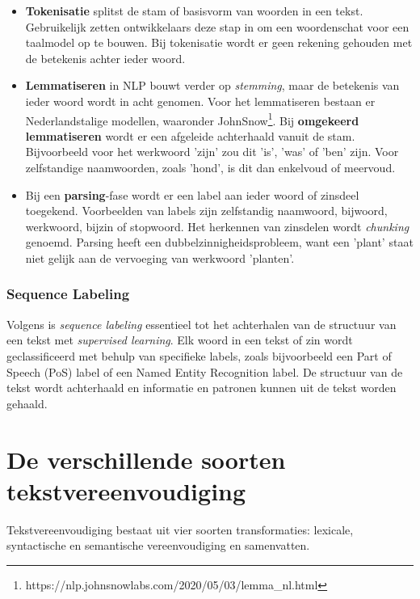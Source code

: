 \begin{itemize}
	\item \textbf{Tokenisatie} splitst de stam of basisvorm van woorden in een tekst. Gebruikelijk zetten ontwikkelaars deze stap in om een woordenschat voor een taalmodel op te bouwen. Bij tokenisatie wordt er geen rekening gehouden met de betekenis achter ieder woord.
	\item \textbf{Lemmatiseren} in NLP bouwt verder op \textit{stemming}, maar de betekenis van ieder woord wordt in acht genomen. Voor het lemmatiseren bestaan er Nederlandstalige modellen, waaronder JohnSnow\footnote{https://nlp.johnsnowlabs.com/2020/05/03/lemma\_nl.html}. Bij \textbf{omgekeerd lemmatiseren} wordt er een afgeleide achterhaald vanuit de stam. Bijvoorbeeld voor het werkwoord 'zijn' zou dit 'is', 'was' of 'ben' zijn. Voor zelfstandige naamwoorden, zoals 'hond', is dit dan enkelvoud of meervoud.
	\item Bij een \textbf{parsing}-fase wordt er een label aan ieder woord of zinsdeel toegekend. Voorbeelden van labels zijn zelfstandig naamwoord, bijwoord, werkwoord, bijzin of stopwoord. Het herkennen van zinsdelen wordt \textit{chunking} genoemd. Parsing heeft een dubbelzinnigheidsprobleem, want een 'plant' staat niet gelijk aan de vervoeging van werkwoord 'planten'.
\end{itemize}

\subsubsection{Sequence Labeling}

Volgens \textcite{Eisenstein2019} is \textit{sequence labeling} essentieel tot het achterhalen van de structuur van een tekst met \textit{supervised learning}. Elk woord in een tekst of zin wordt geclassificeerd met behulp van specifieke labels, zoals bijvoorbeeld een Part of Speech (PoS) label of een Named Entity Recognition label. De structuur van de tekst wordt achterhaald en informatie en patronen kunnen uit de tekst worden gehaald. 

\section{De verschillende soorten tekstvereenvoudiging}

Tekstvereenvoudiging bestaat uit vier soorten transformaties: lexicale, syntactische en semantische vereenvoudiging en samenvatten.


